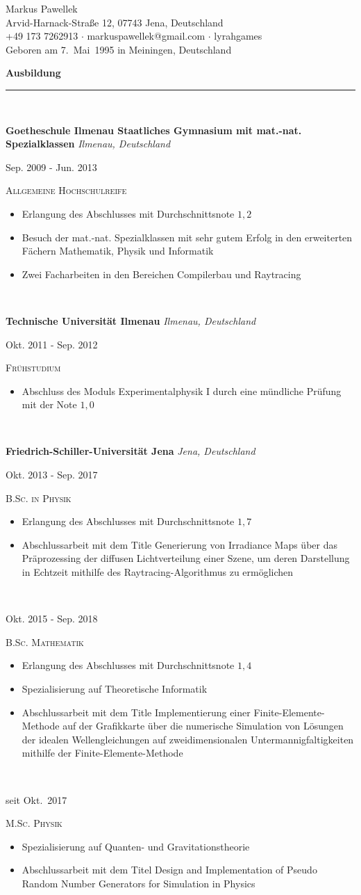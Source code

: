 \documentclass[8pt]{article}
\makeatletter
\newcommand{\cvHead}{
  \begin{center}
    \Huge
    Markus Pawellek \\
    \small
    \faHome{} Arvid-Harnack-Straße 12, 07743 Jena, Deutschland \\
    \faMobile{} +49 173 7262913 $\cdot$ \faEnvelopeO{} markuspawellek@gmail.com $\cdot$ \faGithub{} lyrahgames \\
    Geboren am 7.~Mai~1995 in Meiningen, Deutschland
  \end{center}
  \bigskip
}
\newcommand{\cvSection}[1]{
  {\Large \textbf{#1}}\\
  \rule{\linewidth}{1pt}\\
  \par
}
\newcommand{\cvEducationHeading}[2]{%
  \textbf{#1} \hfill \textit{\footnotesize #2} \\[1em]
}
\newenvironment{cvEducationItem}[2]{
  \begin{minipage}[t]{\textwidth}
  \begin{minipage}[t]{0.1\textwidth}
    \raggedleft
    \small
    #1
  \end{minipage}
  \quad
  \vrule
  \quad
  \begin{minipage}[t]{0.8\textwidth}
    \textsc{\small #2}
    \begin{itemize}
      \itemsep0pt
      \footnotesize
}{
    \end{itemize}
  \end{minipage}
  \end{minipage}\\[1em]
}
\makeatother
\begin{document}
  \sffamily
  \cvHead

  \cvSection{Ausbildung}
  \cvEducationHeading{Goetheschule Ilmenau Staatliches Gymnasium mit mat.-nat. Spezialklassen}{Ilmenau, Deutschland}
  \begin{cvEducationItem}{Sep. 2009 - Jun. 2013}{Allgemeine Hochschulreife}
    \item Erlangung des Abschlusses mit Durchschnittsnote $1{,}2$
    \item Besuch der mat.-nat. Spezialklassen mit sehr gutem Erfolg in den erweiterten Fächern Mathematik, Physik und Informatik
    \item Zwei Facharbeiten in den Bereichen Compilerbau und Raytracing
  \end{cvEducationItem}

  \cvEducationHeading{Technische Universität Ilmenau}{Ilmenau, Deutschland}
  \begin{cvEducationItem}{Okt. 2011 - Sep. 2012}{Frühstudium}
    \item Abschluss des Moduls Experimentalphysik I durch eine mündliche Prüfung mit der Note $1{,}0$
  \end{cvEducationItem}

  \cvEducationHeading{Friedrich-Schiller-Universität Jena}{Jena, Deutschland}
  \begin{cvEducationItem}{Okt. 2013 - Sep. 2017}{B.Sc. in Physik}
    \item Erlangung des Abschlusses mit Durchschnittsnote $1{,}7$
    \item Abschlussarbeit mit dem Title Generierung von Irradiance Maps über das Präprozessing der diffusen Lichtverteilung einer Szene, um deren Darstellung in Echtzeit mithilfe des Raytracing-Algorithmus zu ermöglichen
  \end{cvEducationItem}
  \begin{cvEducationItem}{Okt. 2015 - Sep. 2018}{B.Sc. Mathematik}
    \item Erlangung des Abschlusses mit Durchschnittsnote $1{,}4$
    \item Spezialisierung auf Theoretische Informatik
    \item Abschlussarbeit mit dem Title Implementierung einer Finite-Elemente-Methode auf der Grafikkarte über die numerische Simulation von Lösungen der idealen Wellengleichungen auf zweidimensionalen Untermannigfaltigkeiten mithilfe der Finite-Elemente-Methode
  \end{cvEducationItem}
  \begin{cvEducationItem}{seit Okt.~2017}{M.Sc. Physik}
    \item Spezialisierung auf Quanten- und Gravitationstheorie
    \item Abschlussarbeit mit dem Titel Design and Implementation of Pseudo Random Number Generators for Simulation in Physics
  \end{cvEducationItem}
\end{document}
